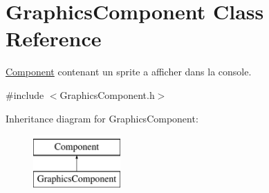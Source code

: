 \hypertarget{class_graphics_component}{}\section{Graphics\+Component Class Reference}
\label{class_graphics_component}


\hyperlink{class_component}{Component} contenant un sprite a afficher dans la console.  




{\ttfamily \#include $<$Graphics\+Component.\+h$>$}

Inheritance diagram for Graphics\+Component\+:\begin{figure}[H]
\begin{center}
\leavevmode
\includegraphics[height=2.000000cm]{class_graphics_component}
\end{center}
\end{figure}
